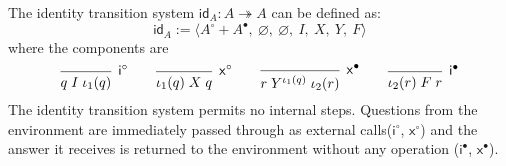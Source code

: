 \documentclass[sigplan,10pt,review,anonymous]{acmart}
\newcommand{\kw}[1]{\ensuremath{ \mathsf{#1} }}
\begin{document}
\begin{definition} \label{def:lts-id}

The identity transition system $\mathsf{id}_A : A \twoheadrightarrow A$ can be
defined as:
\[
  \mathsf{id}_A :=
  \langle A^\circ + A^\bullet,\: \varnothing,\: \varnothing,\: I,\: X,\: Y,\: F \rangle
\]
where the components are
\[
  \begin{prooftree}
    \infer0[$\kw{i}^\circ$]{q \mathrel{I} \iota_1(q)}
  \end{prooftree}
  \qquad
  \begin{prooftree}
    \infer0[$\kw{x}^\circ$]{\iota_1(q) \mathrel{X} q}
  \end{prooftree}
  \qquad
  \begin{prooftree}
    \infer0[$\kw{x}^\bullet$]{r \mathrel{Y^{\iota_1(q)}} \iota_2(r)}
  \end{prooftree}
  \qquad
  \begin{prooftree}
    \infer0[$\kw{i}^\bullet$]{\iota_2(r) \mathrel{F} r}
  \end{prooftree}
\]
The identity transition system permits no internal steps. Questions from the
environment are immediately passed through as external calls($\kw{i}^\circ$,
$\kw{x}^\circ$) and the answer it receives is returned to the environment
without any operation ($\kw{i}^\bullet$, $\kw{x}^\bullet$).

\end{definition}
\end{document}
